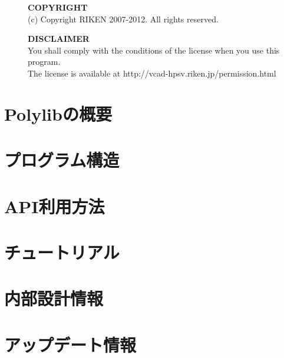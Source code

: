 \documentclass[a4paper,10pt,oneside,fleqn]{jsbook}
\newcounter{program}
\begin{document}
\vspace{15cm}

\begin{description}
\item[ ] \textbf{COPYRIGHT}\\
(c) Copyright RIKEN 2007-2012. All rights reserved.\\

\item[ ] \textbf{DISCLAIMER}\\
You shall comply with the conditions of the license when you use this program.\\
The license is available at http://vcad-hpsv.riken.jp/permission.html
\end{description}
%

\tableofcontents
%
%
\mainmatter

\chapter{Polylibの概要}


\chapter{プログラム構造}


\chapter{API利用方法}


\chapter{チュートリアル}


\chapter{内部設計情報}


\chapter{アップデート情報}


%
%
%

\newpage
\printindex
%
%
\end{document}
